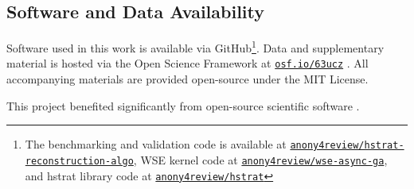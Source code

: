 \subsection{Software and Data Availability} \label{sec:materials}

Software used in this work is available via GitHub\footnote{The benchmarking and validation code is available at \href{https://github.com/anony4review/hstrat-reconstruction-algo}{\texttt{anony4review/hstrat-reconstruction-algo}}, WSE kernel code at \href{https://github.com/anony4review/wse-async-ga}{\texttt{anony4review/wse-async-ga}}, and hstrat library code at \href{https://github.com/anony4review/hstrat}{\texttt{anony4review/hstrat}}}.
Data and supplementary material is hosted via the Open Science Framework at \href{https://osf.io/63ucz/?view_only=2e3ec335c016436494ad125b14ffc8cb}{\texttt{osf.io/63ucz}} \citep{supplemental,foster2017open}.
All accompanying materials are provided open-source under the MIT License.

This project benefited significantly from open-source scientific software \citep{2020SciPy-NMeth,harris2020array,reback2020pandas,mckinney2010data,waskom2021seaborn,hunter2007matplotlib,moreno2023teeplot,moreno2024downstream}.